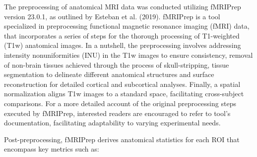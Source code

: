\documentclass{cys}
\begin{document}
The preprocessing of anatomical MRI data was conducted utilizing fMRIPrep version 23.0.1, as outlined by Esteban et al. (2019). fMRIPrep is a tool specialized in preprocessing functional magnetic resonance imaging (fMRI) data, that incorporates a series of steps for the thorough processing of T1-weighted (T1w) anatomical images. In a nutshell, the preprocessing involves addressing intensity nonuniformities (INU) in the T1w images to ensure consistency, removal of non-brain tissues achieved through the process of skull-stripping, tissue segmentation to delineate different anatomical structures and surface reconstruction for detailed cortical and subcortical analyses. Finally, a spatial normalization aligns T1w images to a standard space, facilitating cross-subject comparisons. For a more detailed account of the original preprocessing steps executed by fMRIPrep, interested readers are encouraged to refer to tool's documentation, facilitating adaptability to varying experimental needs.


\bigskip
Post-preprocessing, fMRIPrep derives anatomical statistics for each ROI that encompass key metrics such as:
\end{document}
